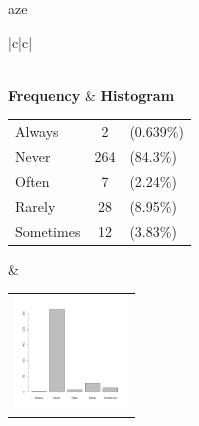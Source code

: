  aze 
  \begin{center}
    \addtolength{\leftskip}{-4cm}\addtolength{\rightskip}{-4cm}
    \begin{tabular}{|c|c|}

      \hline
        \\
      \hline
        {\bf Frequency} & {\bf Histogram}  \\
          \begin{tabular}{@{}l@{ : }cl@{}}
            Always & 2 &(0.639\%) \\
            Never & 264 &(84.3\%) \\
            Often & 7 &(2.24\%) \\
            Rarely & 28 &(8.95\%) \\
            Sometimes & 12 &(3.83\%) \\
          \end{tabular}
      &
          \begin{tabular}{@{}l@{}}
            \includegraphics[width=3cm]{graphUniv/V12-barplot}
          \end{tabular}
      \\ \hline 

    \end{tabular}
  \end{center}
  
  



